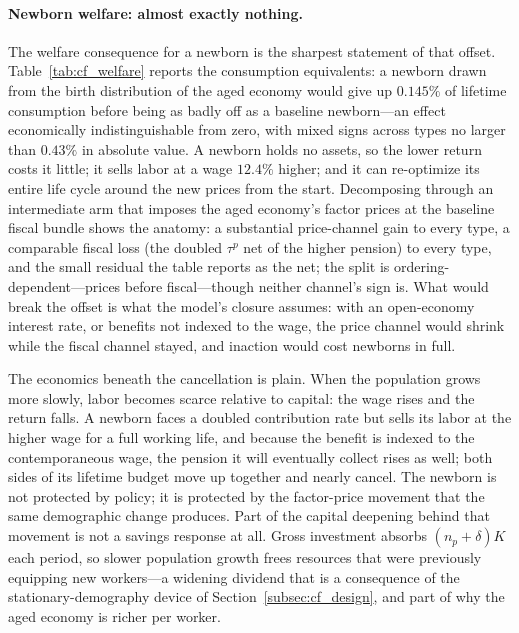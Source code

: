 \documentclass[12pt,a4paper]{article}
\begin{document}
\paragraph{Newborn welfare: almost exactly nothing.} The welfare consequence for a newborn is the sharpest statement of that offset. Table~\ref{tab:cf_welfare} reports the consumption equivalents: a newborn drawn from the birth distribution of the aged economy would give up $0.145\%$ of lifetime consumption before being as badly off as a baseline newborn---an effect economically indistinguishable from zero, with mixed signs across types no larger than $0.43\%$ in absolute value. A newborn holds no assets, so the lower return costs it little; it sells labor at a wage $12.4\%$ higher; and it can re-optimize its entire life cycle around the new prices from the start. Decomposing through an intermediate arm that imposes the aged economy's factor prices at the baseline fiscal bundle shows the anatomy: a substantial price-channel gain to every type, a comparable fiscal loss (the doubled $\tau^p$ net of the higher pension) to every type, and the small residual the table reports as the net; the split is ordering-dependent---prices before fiscal---though neither channel's sign is. What would break the offset is what the model's closure assumes: with an open-economy interest rate, or benefits not indexed to the wage, the price channel would shrink while the fiscal channel stayed, and inaction would cost newborns in full.

The economics beneath the cancellation is plain. When the population grows more slowly, labor becomes scarce relative to capital: the wage rises and the return falls. A newborn faces a doubled contribution rate but sells its labor at the higher wage for a full working life, and because the benefit is indexed to the contemporaneous wage, the pension it will eventually collect rises as well; both sides of its lifetime budget move up together and nearly cancel. The newborn is not protected by policy; it is protected by the factor-price movement that the same demographic change produces. Part of the capital deepening behind that movement is not a savings response at all. Gross investment absorbs $(n_p+\delta)K$ each period, so slower population growth frees resources that were previously equipping new workers---a widening dividend that is a consequence of the stationary-demography device of Section~\ref{subsec:cf_design}, and part of why the aged economy is richer per worker.
\end{document}
